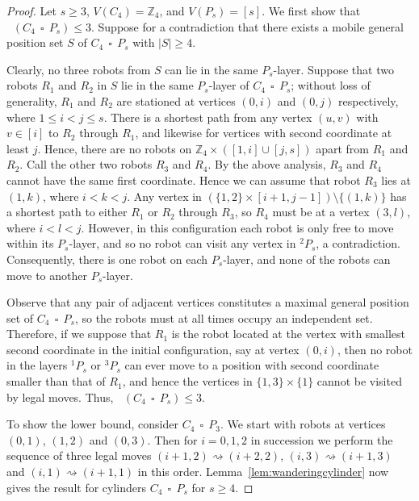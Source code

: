 \documentclass[a4paper,12pt]{article}
\DeclareMathOperator{\mob}{Mob_{gp}}
\DeclareMathOperator{\cp}{\,\square\,}
\theoremstyle{definition}
\newcommand{\move}{\rightsquigarrow}
\begin{document}
	\begin{proof}
		Let $s \geq 3$, $V(C_4) = \mathbb{Z}_4$, and $V(P_s) = [s]$. We first show that $\mob(C_4 \cp P_s) \leq 3$. Suppose for a contradiction that there exists a mobile general position set $S$ of $C_4 \cp P_s$ with $|S| \geq 4$. 
		
		Clearly, no three robots from $S$ can lie in the same $P_s$-layer. Suppose that two robots $R_1$ and $R_2$ in $S$ lie in the same $P_s$-layer of $C_4 \cp P_s$; without loss of generality, $R_1$ and $R_2$ are stationed at vertices $(0,i)$ and $(0,j)$ respectively, where $1 \leq i < j \leq s$. There is a shortest path from any vertex $(u,v)$ with $v \in [i]$ to $R_2$ through $R_1$, and likewise for vertices with second coordinate at 
		least $j$. Hence, there are no robots on $\mathbb{Z}_4 \times \left ( [1,i] \cup [j,s]\right )$ apart from $R_1$ and $R_2$. Call the other two robots $R_3$ and $R_4$. By the above analysis, $R_3$ and $R_4$ cannot have the same first coordinate. Hence we can assume that robot $R_3$ lies at $(1,k)$, where $i < k < j$. Any vertex in $\left (\{ 1,2\} \times [i+1,j-1] \right ) \setminus \{ (1,k)\} $ has a shortest path to either $R_1$ or $R_2$ through $R_3$, so $R_4$ must be at a vertex $(3,l)$, where $i < l < j$. However, in this configuration each robot is only free to move within its $P_s$-layer, and so no robot can visit any vertex in $^2P_s$, a contradiction. Consequently, there is one robot on each $P_s$-layer, and none of the robots can move to another $P_s$-layer.
		
		Observe that any pair of adjacent vertices constitutes a maximal general position set of $C_4 \cp P_s$, so the robots must at all times occupy an independent set. Therefore, if we suppose that $R_1$ is the robot located at the vertex with smallest second coordinate in the initial configuration, say at vertex $(0,i)$, then no robot in the layers $^1P_s$ or $^3P_s$ can ever move to a position with second coordinate smaller than that of $R_1$, and hence the vertices in $\{ 1,3\} \times \{ 1\} $ cannot be visited by legal moves. Thus, $\mob (C_4 \cp P_s) \leq 3$.
		
		To show the lower bound, consider $C_4 \cp P_3$. We start with robots at vertices $(0,1)$, $(1,2)$ and $(0,3)$. Then for $i = 0,1,2$ in succession we perform the sequence of three legal moves $(i+1,2) \move (i+2,2)$, $(i,3) \move (i+1,3)$ and $(i,1) \move (i+1,1)$ in this order. Lemma~\ref{lem:wanderingcylinder} now gives the result for cylinders $C_4 \cp P_s$ for $s \geq 4$.    
	\end{proof}
	
\end{document}
